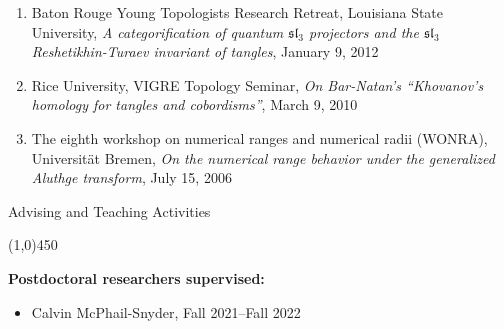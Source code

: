 \documentclass[10pt]{article}
\begin{document}
\begin{enumerate}
\item Baton Rouge Young Topologists Research Retreat, Louisiana State University, 
\emph{A categorification of quantum $\mathfrak{sl}_3$ projectors 
and the $\mathfrak{sl}_3$ Reshetikhin-Turaev invariant of tangles}, January 9, 2012

\item Rice University, VIGRE Topology Seminar, 
\emph{On Bar-Natan's ``Khovanov's homology for tangles and cobordisms''}, March 9, 2010

\item The eighth workshop on numerical ranges and numerical radii (WONRA), 
Universit\"{a}t Bremen, 
\emph{On the numerical range behavior under the generalized Aluthge transform}, 
July 15, 2006


\end{enumerate}




\bigskip
\noindent
{\large \sc Advising and Teaching Activities}

\vspace{-0.1in}
\noindent
\line(1,0){450}

\smallskip
\noindent\textbf{Postdoctoral researchers supervised:}
\begin{itemize}

\item Calvin McPhail-Snyder, Fall 2021--Fall 2022

\end{itemize}
\end{document}
